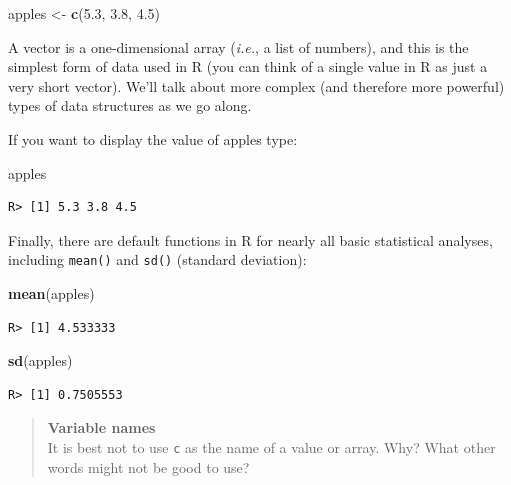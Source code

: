 \documentclass[
]{book}
\newenvironment{Shaded}{\begin{snugshade}}{\end{snugshade}}
\newcommand{\FloatTok}[1]{\textcolor[rgb]{0.00,0.00,0.81}{#1}}
\newcommand{\KeywordTok}[1]{\textcolor[rgb]{0.13,0.29,0.53}{\textbf{#1}}}
\newcommand{\NormalTok}[1]{#1}
\newcommand{\StringTok}[1]{\textcolor[rgb]{0.31,0.60,0.02}{#1}}
\begin{document}
\begin{Shaded}
\begin{Highlighting}[]
\NormalTok{apples <{-}}\StringTok{ }\KeywordTok{c}\NormalTok{(}\FloatTok{5.3}\NormalTok{, }\FloatTok{3.8}\NormalTok{, }\FloatTok{4.5}\NormalTok{)}
\end{Highlighting}
\end{Shaded}

A vector is a one-dimensional array (\emph{i.e.}, a list of numbers), and this is the simplest form of data used in R (you can think of a single value in R as just a very short vector). We'll talk about more complex (and therefore more powerful) types of data structures as we go along.

If you want to display the value of apples type:

\begin{Shaded}
\begin{Highlighting}[]
\NormalTok{apples}
\end{Highlighting}
\end{Shaded}

\begin{verbatim}
R> [1] 5.3 3.8 4.5
\end{verbatim}

Finally, there are default functions in R for nearly all basic statistical analyses, including \texttt{mean()} and \texttt{sd()} (standard deviation):

\begin{Shaded}
\begin{Highlighting}[]
\KeywordTok{mean}\NormalTok{(apples)}
\end{Highlighting}
\end{Shaded}

\begin{verbatim}
R> [1] 4.533333
\end{verbatim}

\begin{Shaded}
\begin{Highlighting}[]
\KeywordTok{sd}\NormalTok{(apples)}
\end{Highlighting}
\end{Shaded}

\begin{verbatim}
R> [1] 0.7505553
\end{verbatim}

\begin{quote}
\textbf{Variable names}\\
It is best not to use \texttt{c} as the name of a value or array. Why? What other words might not be good to use?
\end{quote}
\end{document}
